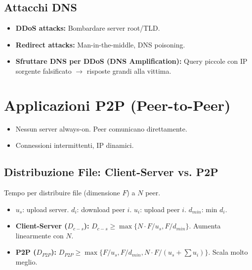 \subsection{Attacchi DNS}
\begin{itemize}
    \item \textbf{DDoS attacks:} Bombardare server root/TLD.
    \item \textbf{Redirect attacks:} Man-in-the-middle, DNS poisoning.
    \item \textbf{Sfruttare DNS per DDoS (DNS Amplification):} Query piccole con IP sorgente falsificato $\rightarrow$ risposte grandi alla vittima.
\end{itemize}

\section{Applicazioni P2P (Peer-to-Peer)}
\begin{itemize}
    \item Nessun server always-on. Peer comunicano direttamente.
    \item Connessioni intermittenti, IP dinamici.
\end{itemize}

\subsection{Distribuzione File: Client-Server vs. P2P}
Tempo per distribuire file (dimensione $F$) a $N$ peer.
\begin{itemize}
    \item $u_s$: upload server. $d_i$: download peer $i$. $u_i$: upload peer $i$. $d_{min}$: min $d_i$.
    \item \textbf{Client-Server ($D_{c-s}$):} $D_{c-s} \ge \max\{N \cdot F/u_s, F/d_{min}\}$. Aumenta linearmente con $N$.
    \item \textbf{P2P ($D_{P2P}$):} $D_{P2P} \ge \max\{F/u_s, F/d_{min}, N \cdot F/(u_s + \sum u_i)\}$. Scala molto meglio.
\end{itemize}

